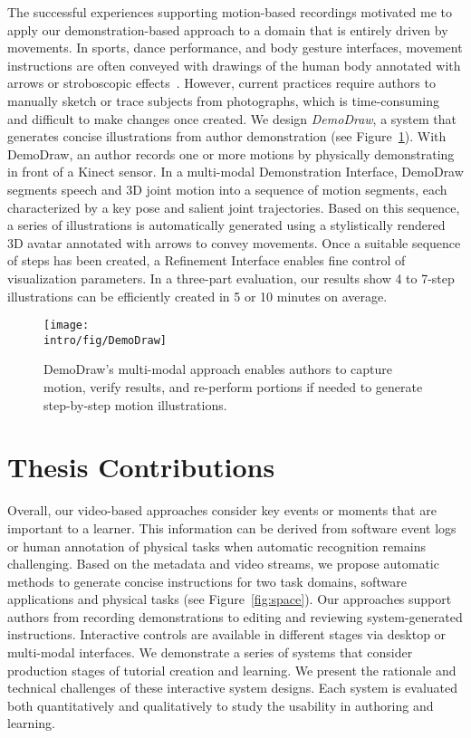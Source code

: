The successful experiences supporting motion-based recordings motivated me to apply our demonstration-based approach to a domain that is entirely driven by movements. In sports, dance performance, and body gesture interfaces, movement instructions are often conveyed with drawings of the human body annotated with arrows or stroboscopic effects~\cite{cutting_representing_2002}. However, current practices require authors to manually sketch or trace subjects from photographs, which is time-consuming and difficult to make changes once created.
%
We design \emph{DemoDraw}, a system that generates concise illustrations from author demonstration (see Figure~\ref{fig:demodraw_intro}). With DemoDraw, an author records one or more motions by physically demonstrating in front of a Kinect sensor. In a multi-modal Demonstration Interface, DemoDraw segments speech and 3D joint motion into a sequence of motion segments, each characterized by a key pose and salient joint trajectories. Based on this sequence, a series of illustrations is automatically generated using a stylistically rendered 3D avatar annotated with arrows to convey movements. Once a suitable sequence of steps has been created, a Refinement Interface enables fine control of visualization parameters.
%
In a three-part evaluation, our results show 4 to 7-step illustrations can be efficiently created in 5 or 10 minutes on average.

\begin{figure}[t]
  \centering
  \texttt{[image: \\intro/fig/DemoDraw]}
  \caption{DemoDraw's multi-modal approach enables authors to capture motion, verify results, and re-perform portions if needed to generate step-by-step motion illustrations.}
  \label{fig:demodraw_intro}
\end{figure}


\section{Thesis Contributions}

Overall, our video-based approaches consider key events or moments that are important to a learner. This information can be derived from software event logs or human annotation of physical tasks when automatic recognition remains challenging. Based on the metadata and video streams, we propose automatic methods to generate concise instructions for two task domains, software applications and physical tasks (see Figure~\ref{fig:space}). Our approaches support authors from recording demonstrations to editing and reviewing system-generated instructions. Interactive controls are available in different stages via desktop or multi-modal interfaces.
%
We demonstrate a series of systems that consider production stages of tutorial creation and learning. We present the rationale and technical challenges of these interactive system designs. Each system is evaluated both quantitatively and qualitatively to study the usability in authoring and learning.


